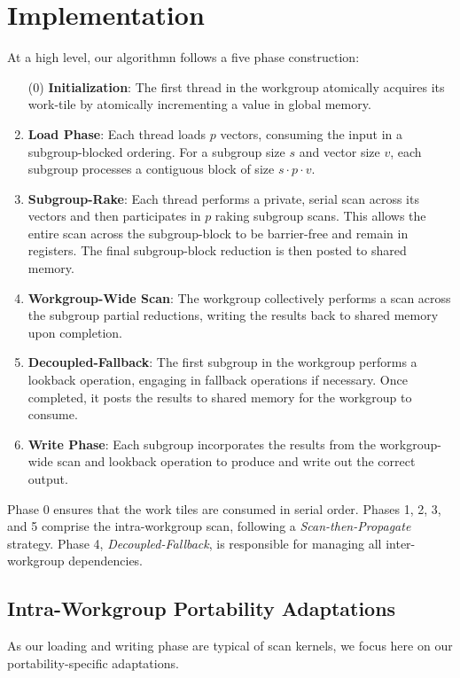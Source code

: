 \documentclass[sigconf]{acmart}
\begin{document}
\section{Implementation}
At a high level, our algorithmn follows a five phase construction:
\begin{enumerate}
  \item[(0)] \textbf {Initialization}: The first thread in the workgroup atomically acquires its work-tile by atomically incrementing a value in global memory.
  \item \textbf{Load Phase}: Each thread loads $p$ vectors, consuming the input in a subgroup-blocked ordering. For a subgroup size $s$ and vector size $v$, each subgroup processes a contiguous block of size $s \cdot p \cdot v$. 
  \item \textbf{Subgroup-Rake}: Each thread performs a private, serial scan across its vectors and then participates in $p$ raking subgroup scans. This allows the entire scan across the subgroup-block to be barrier-free and remain in registers. The final subgroup-block reduction is then posted to shared memory. 
  \item \textbf{Workgroup-Wide Scan}: The workgroup collectively performs a scan across the subgroup partial reductions, writing the results back to shared memory upon completion. 
  \item \textbf{Decoupled-Fallback}: The first subgroup in the workgroup performs a lookback operation, engaging in fallback operations if necessary. Once completed, it posts the results to shared memory for the workgroup to consume. 
  \item \textbf{Write Phase}: Each subgroup incorporates the results from the workgroup-wide scan and lookback operation to produce and write out the correct output. 
\end{enumerate}
Phase 0 ensures that the work tiles are consumed in serial order. Phases 1, 2, 3, and 5 comprise the intra-workgroup scan, following a \emph{Scan-then-Propagate} strategy. Phase 4, \emph{Decoupled-Fallback}, is responsible for managing all inter-workgroup dependencies.

\subsection{Intra-Workgroup Portability Adaptations}
As our loading and writing phase are typical of scan kernels, we focus here on our portability-specific adaptations. 
\end{document}
